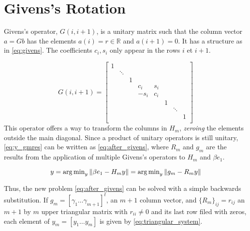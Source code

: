 \section{Givens's Rotation}

Givens's operator, $G(i,i+1)$, is a unitary matrix such that the column vector $a = Gb$ has the elements $a(i) = r \in \mathbb{R}$ and $a(i+1)=0$. It has a structure as in \ref{eq:givens}. The coefficients $c_{i},s_{i}$ only appear in the rows $i$ et $i+1$.

\begin{equation}\label{eq:givens}
    G(i,i+1)=
    \begin{bmatrix}
        1 &        &   &        &       &   &        &   \\
          & \ddots &   &        &       &   &        &   \\
          &        & 1 &        &       &   &        &   \\
          &        &   & c_{i}  & s_{i} &   &        &   \\
          &        &   & -s_{i} & c_{i} &   &        &   \\
          &        &   &        &       & 1 &        &   \\
          &        &   &        &       &   & \ddots &   \\
          &        &   &        &       &   &        & 1 \\
    \end{bmatrix}
\end{equation}
This operator offers a way to transform the columns in $H_{m}$, \textit{zeroing} the elements outside the main diagonal. Since a product of unitary operators is still unitary, \ref{eq:y_gmres} can be written as \ref{eq:after_givens}, where $R_{m}$ and $g_{m}$ are the results from the application of multiple Givens's operators to $H_{m}$ and $\beta e_{1}$.

\begin{equation}\label{eq:after_givens}
    y = \operatorname{arg\,min}_{y} \left\lVert\beta e_{1} - H_{m}y\right\rVert = \operatorname{arg\,min}_{y} \left\lVert g_{m} - R_{m}y\right\rVert
\end{equation}


Thus, the new problem \ref{eq:after_givens} can be solved with a simple backwards substitution. If $g_{m} = [\gamma_{1} \dots \gamma_{m+1}]^{t}$, an $m+1$ column vector, and $\{ R_{m} \}_{ij} = r_{ij}$ an $m+1$ by $m$ upper triangular matrix with $r_{ii} \neq 0$ and its last row filed with zeros, each element of $y_{m} = [y_{1} \dots y_{m}]$ is given by \ref{eq:triangular_system}.


